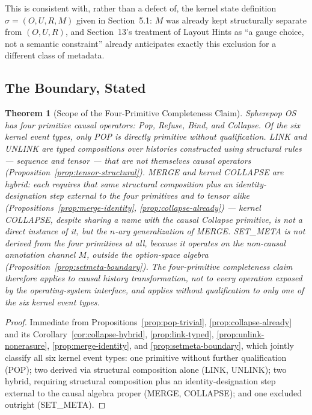 \documentclass[11pt]{article}
\newtheorem{theorem}{Theorem}[section]
\begin{document}
This is consistent with, rather than a defect of, the kernel state definition $\sigma = (O,U,R,M)$ given in Section~5.1: $M$ was already kept structurally separate from $(O,U,R)$, and Section~13's treatment of Layout Hints as ``a gauge choice, not a semantic constraint'' already anticipates exactly this exclusion for a different class of metadata.

\subsection{The Boundary, Stated}

\begin{theorem}[Scope of the Four-Primitive Completeness Claim]
\label{thm:completeness-scope}
Spherepop OS has four primitive causal operators: Pop, Refuse, Bind, and Collapse. Of the six kernel event types, only POP is directly primitive without qualification. LINK and UNLINK are typed compositions over histories constructed using structural rules --- sequence and tensor --- that are not themselves causal operators (Proposition~\ref{prop:tensor-structural}). MERGE and kernel COLLAPSE are hybrid: each requires that same structural composition \emph{plus} an identity-designation step external to the four primitives and to tensor alike (Propositions~\ref{prop:merge-identity}, \ref{prop:collapse-already}) --- kernel COLLAPSE, despite sharing a name with the causal Collapse primitive, is not a direct instance of it, but the $n$-ary generalization of MERGE. SET\_META is not derived from the four primitives at all, because it operates on the non-causal annotation channel $M$, outside the option-space algebra (Proposition~\ref{prop:setmeta-boundary}). The four-primitive completeness claim therefore applies to causal history transformation, not to every operation exposed by the operating-system interface, and applies without qualification to only one of the six kernel event types.
\end{theorem}
\begin{proof}
Immediate from Propositions~\ref{prop:pop-trivial}, \ref{prop:collapse-already} and its Corollary~\ref{cor:collapse-hybrid}, \ref{prop:link-typed}, \ref{prop:unlink-nonerasure}, \ref{prop:merge-identity}, and \ref{prop:setmeta-boundary}, which jointly classify all six kernel event types: one primitive without further qualification (POP); two derived via structural composition alone (LINK, UNLINK); two hybrid, requiring structural composition plus an identity-designation step external to the causal algebra proper (MERGE, COLLAPSE); and one excluded outright (SET\_META).
\end{proof}
\end{document}

